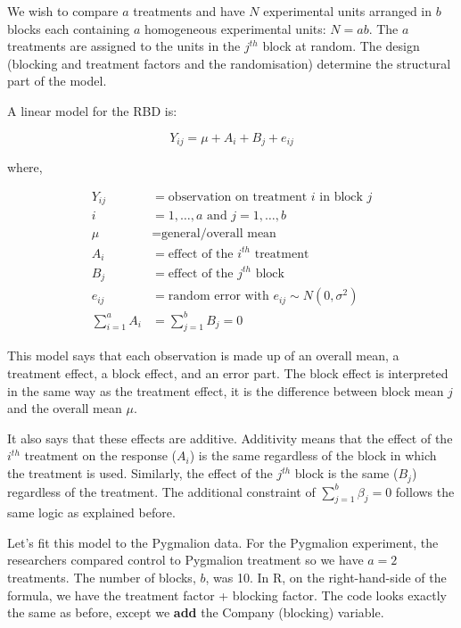 \documentclass[
  letterpaper,
]{book}
\begin{document}

We wish to compare \(a\) treatments and have \(N\) experimental units
arranged in \(b\) blocks each containing \(a\) homogeneous experimental
units: \(N = ab\). The \(a\) treatments are assigned to the units in the
\(j^{th}\) block at random. The design (blocking and treatment factors
and the randomisation) determine the structural part of the model.

A linear model for the RBD is:

\[Y_{ij} = \mu + A_i + B_j  +e_{ij}\]

where,

\[
\begin{aligned}
    Y_{ij} &= \text{observation on treatment } i \text{ in block } j \\
    i &= 1, \dots, a \text{ and } j = 1, \dots, b \\
    \mu &= \text{general/overall mean} \\
    A_i &= \text{effect of the } i^{th} \text{ treatment} \\
    B_j &= \text{effect of the } j^{th} \text{ block} \\
    e_{ij} &= \text{random error with } e_{ij} \sim N(0, \sigma^2) \\
    \sum_{i=1}^{a} A_i &= \sum_{j=1}^{b} B_j = 0
\end{aligned}
\]

This model says that each observation is made up of an overall mean, a
treatment effect, a block effect, and an error part. The block effect is
interpreted in the same way as the treatment effect, it is the
difference between block mean \(j\) and the overall mean \(\mu\).

It also says that these effects are additive. Additivity means that the
effect of the \(i^{th}\) treatment on the response (\(A_i\)) is the same
regardless of the block in which the treatment is used. Similarly, the
effect of the \(j^{th}\) block is the same (\(B_j\)) regardless of the
treatment. The additional constraint of \(\sum_{j=1}^{b} \beta_j = 0\)
follows the same logic as explained before.

Let's fit this model to the Pygmalion data. For the Pygmalion
experiment, the researchers compared control to Pygmalion treatment so
we have \(a=2\) treatments. The number of blocks, \(b\), was 10. In R,
on the right-hand-side of the formula, we have the treatment factor +
blocking factor. The code looks exactly the same as before, except we
\textbf{add} the Company (blocking) variable.
\end{document}
